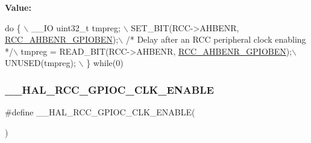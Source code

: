 {\bfseries Value\+:}
\begin{DoxyCode}
\textcolor{keywordflow}{do} \{ \(\backslash\)
                                        \_\_IO uint32\_t tmpreg; \(\backslash\)
                                        SET\_BIT(RCC->AHBENR, \hyperlink{group___peripheral___registers___bits___definition_gab7995351a5b0545e8cd86a228d97dcec}{RCC\_AHBENR\_GPIOBEN});\(\backslash\)
                                        \textcolor{comment}{/* Delay after an RCC peripheral clock enabling */}\(\backslash\)
                                        tmpreg = READ\_BIT(RCC->AHBENR, 
      \hyperlink{group___peripheral___registers___bits___definition_gab7995351a5b0545e8cd86a228d97dcec}{RCC\_AHBENR\_GPIOBEN});\(\backslash\)
                                        UNUSED(tmpreg); \(\backslash\)
                                      \} \textcolor{keywordflow}{while}(0)
\end{DoxyCode}
\mbox{\label{group___r_c_c___a_h_b___clock___enable___disable_ga5ebfeb136612f370950f52306d29b6fd}} 
\subsubsection{\texorpdfstring{\+\_\+\+\_\+\+H\+A\+L\+\_\+\+R\+C\+C\+\_\+\+G\+P\+I\+O\+C\+\_\+\+C\+L\+K\+\_\+\+E\+N\+A\+B\+LE}{\_\_HAL\_RCC\_GPIOC\_CLK\_ENABLE}}
{\footnotesize\ttfamily \#define \+\_\+\+\_\+\+H\+A\+L\+\_\+\+R\+C\+C\+\_\+\+G\+P\+I\+O\+C\+\_\+\+C\+L\+K\+\_\+\+E\+N\+A\+B\+LE(\begin{DoxyParamCaption}{ }\end{DoxyParamCaption})}


